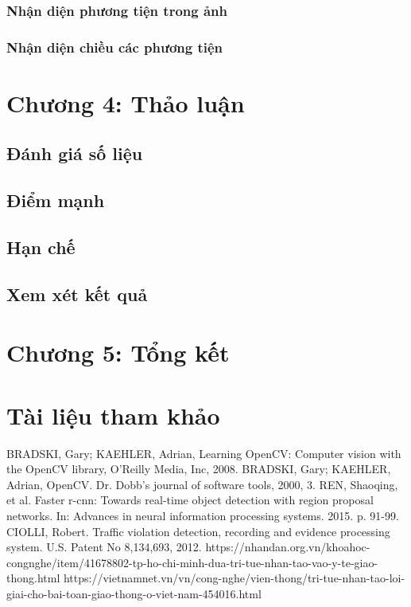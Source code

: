 \documentclass[14pt,oneside,a4paper]{extreport}
\begin{document}
\subsubsection{Nhận diện phương tiện trong ảnh}
\subsubsection{Nhận diện chiều các phương tiện}
\section{Chương 4: Thảo luận}
\subsection{Đánh giá số liệu}
\subsection{Điểm mạnh}
\subsection{Hạn chế}
\subsection{Xem xét kết quả}
\section{Chương 5: Tổng kết}
\section{Tài liệu tham khảo}
\renewcommand{\labelenumi}{[\arabic{enumi}]}
\begin{thebibliography}{9}
	 BRADSKI, Gary; KAEHLER, Adrian, Learning OpenCV: Computer vision with the OpenCV library, O'Reilly Media, Inc, 2008.
	 BRADSKI, Gary; KAEHLER, Adrian, OpenCV. Dr. Dobb’s journal of software tools, 2000, 3.
	 REN, Shaoqing, et al. Faster r-cnn: Towards real-time object detection with region proposal networks. In: Advances in neural information processing systems. 2015. p. 91-99.
	 CIOLLI, Robert. Traffic violation detection, recording and evidence processing system. U.S. Patent No 8,134,693, 2012.
	https://nhandan.org.vn/khoahoc-congnghe/item/41678802-tp-ho-chi-minh-dua-tri-tue-nhan-tao-vao-y-te-giao-thong.html
	https://vietnamnet.vn/vn/cong-nghe/vien-thong/tri-tue-nhan-tao-loi-giai-cho-bai-toan-giao-thong-o-viet-nam-454016.html
\end{thebibliography}
\end{document}
